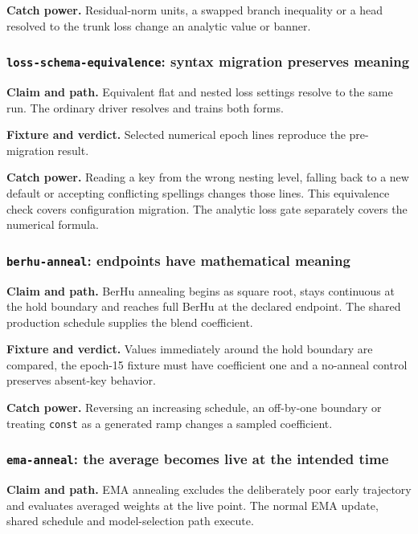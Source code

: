 \documentclass[10pt,aps,prd,twocolumn,nofootinbib]{revtex4-2}
\newcommand{\code}[1]{\texttt{#1}}
\begin{document}
\textbf{Catch power.}  Residual-norm units, a swapped branch inequality or a
head resolved to the trunk loss change an analytic value or banner.

\subsubsection{\code{loss-schema-equivalence}: syntax migration preserves meaning}

\textbf{Claim and path.}  Equivalent flat and nested loss settings resolve to
the same run.  The ordinary driver resolves and trains both forms.

\textbf{Fixture and verdict.}  Selected numerical epoch lines reproduce the
pre-migration result.

\textbf{Catch power.}  Reading a key from the wrong nesting level, falling
back to a new default or accepting conflicting spellings changes those
lines.  This equivalence check covers configuration migration.  The analytic
loss gate separately covers the numerical formula.

\subsubsection{\code{berhu-anneal}: endpoints have mathematical meaning}

\textbf{Claim and path.}  BerHu annealing begins as square root, stays
continuous at the hold boundary and reaches full BerHu at the declared
endpoint.  The shared production schedule supplies the blend coefficient.

\textbf{Fixture and verdict.}  Values immediately around the hold boundary
are compared, the epoch-15 fixture must have coefficient one and a no-anneal
control preserves absent-key behavior.

\textbf{Catch power.}  Reversing an increasing schedule, an off-by-one
boundary or treating \code{const} as a generated ramp changes a sampled
coefficient.

\subsubsection{\code{ema-anneal}: the average becomes live at the intended time}

\textbf{Claim and path.}  EMA annealing excludes the deliberately poor early
trajectory and evaluates averaged weights at the live point.  The normal EMA
update, shared schedule and model-selection path execute.
\end{document}
